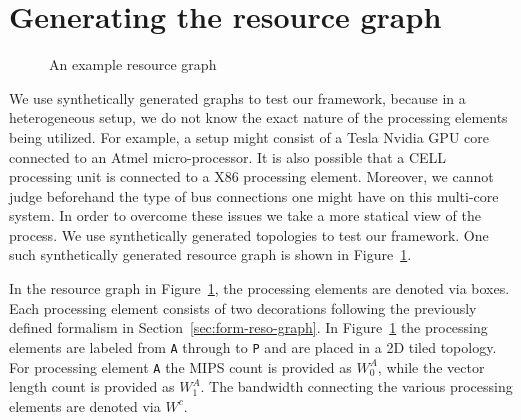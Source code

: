 \section{Generating the resource graph}
\label{sec:gener-reso-graph}


\begin{figure}[t!]
  \centering
  \scalebox{0.38}{}
  \caption{An example resource graph}
  \label{fig:1r}
\end{figure}

We use synthetically generated graphs to test our framework, because in
a heterogeneous setup, we do not know the exact nature of the processing
elements being utilized. For example, a setup might consist of a Tesla
Nvidia GPU core connected to an Atmel micro-processor. It is also
possible that a CELL processing unit is connected to a X86 processing
element. Moreover, we cannot judge beforehand the type of bus
connections one might have on this multi-core system. In order to
overcome these issues we take a more statical view of the process. We
use synthetically generated topologies to test our framework. One such
synthetically generated resource graph is shown in Figure~\ref{fig:1r}.

In the resource graph in Figure~\ref{fig:1r}, the processing elements
are denoted via boxes. Each processing element consists of two
decorations following the previously defined formalism in
Section~\ref{sec:form-reso-graph}. In Figure~\ref{fig:1r} the processing
elements are labeled from \texttt{A} through to \texttt{P} and are
placed in a 2D tiled topology. For processing element \texttt{A} the
MIPS count is provided as $W^A_0$, while the vector length count is
provided as $W^A_1$. The bandwidth connecting the various processing
elements are denoted via $W^c$.

